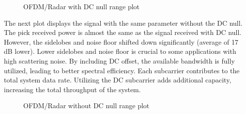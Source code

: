 \documentclass[conference]{IEEEtran}
\begin{document}
\begin{figure}[H]
\centering
{}
\caption{OFDM/Radar with DC null range plot}
\end{figure}

The next plot displays the signal with the same parameter without the DC null. The pick received power is almost the same as the signal received with DC null. However, the sidelobes and noise floor shifted down significantly (average of 17 dB lower). Lower sidelobes and noise floor is crucial to some applications with high scattering noise. By including DC offset, the available bandwidth is fully utilized, leading to better spectral efficiency. Each subcarrier contributes to the total system data rate. Utilizing the DC subcarrier adds additional capacity, increasing the total throughput of the system.

\begin{figure}[H]
\centering
{}
\caption{OFDM/Radar without DC null range plot}
\end{figure}
\end{document}
